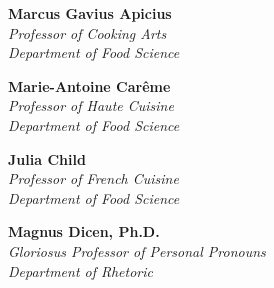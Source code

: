 %
%


\NewDocumentCommand\CommitteePageTitle{m}{
	\vspace*{75pt}%
	\IfPackageLoadedTF{microtype}
		{\textls*{\Large\textbf{\MakeUppercase{#1}}}}
		{{\Large\textbf{\MakeUppercase{#1}}}}%
	\pdfbookmark[0]{#1}{Committee}%
	\vspace*{10pt}%
}

\NewDocumentCommand\Role{m}{
	\vspace*{50pt}%
	\IfPackageLoadedTF{microtype}
		{\textls*{\large{\textsc{#1}}}}
		{{\large\textsc{#1}}}%
	\vspace*{12pt}%
}

\begin{flushright}



 \textbf{Marcus Gavius Apicius} \\
 {\itshape
 Professor of Cooking Arts \\
 Department of Food Science \\
 }


 \textbf{Marie-Antoine Carême} \\
 {\itshape
   Professor of Haute Cuisine \\
   Department of Food Science \\[18pt]
 }

 \textbf{Julia Child}\\
 {\itshape
   Professor of French Cuisine \\
   Department of Food Science \\[18pt]
 }

 \textbf{Magnus Dicen, Ph.D.} \\
 {\itshape
   Gloriosus Professor of Personal Pronouns \\
   Department of Rhetoric \\
 }

\end{flushright}

\cleardoublepage
